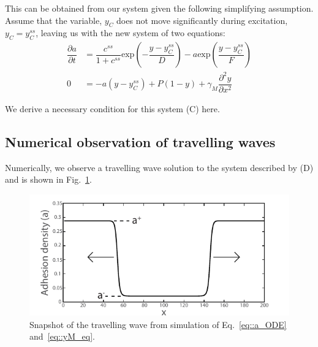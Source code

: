 This can be obtained from our system given the following simplifying assumption. Assume that the variable, $y_C$ does not move significantly during excitation, $y_C = y_C^{ss}$, leaving us with the new system of two equations:
\begin{align}
\dfrac{\partial a}{ \partial t}  & =  \dfrac{c^{ss}}{1+c^{ss}} \mbox{exp}\left(-\dfrac{y-y_C^{ss}}{D}\right) - a \mbox{exp} \left(\dfrac{y-y_C^{ss}}{F} \right)\label{eq::a_ODE}\\
0 & = -a(y - y_C^{ss}) + P (1-y) + \gamma_M \dfrac{\partial^2 y}{\partial x^2}\label{eq::yM_eq}
\end{align} 

We derive a necessary condition for this system (C) here. 
\subsection{Numerical observation of travelling waves} Numerically, we observe a travelling wave solution  to the system described by (D) and is shown in Fig.~\ref{fig::A_wave}.
\begin{figure}[h]
\centering
\captionsetup{width=.9\linewidth}
\includegraphics[width=4.5in]{Project2/figs/A_wave.pdf}
\caption{Snapshot of the travelling wave from simulation of Eq.~\ref{eq::a_ODE} and~\ref{eq::yM_eq}.}
\label{fig::A_wave}
\end{figure}

